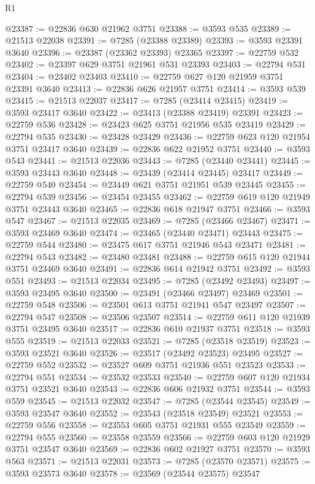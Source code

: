 \begin{lexlean}{R1}
\begin{coremodule}
@23387 := @22836 @630 @21962 @3751
@23388 := @3593 @535
@23389 := @21513 @22038
@23391 := @7285 (@23388 @23389)
@23393 := @3593 @23391 @3640
@23396 := @23387 (@23362 @23393) @23365
@23397 := @22759 @532
@23402 := @23397 @629 @3751 @21961 @531 @23393
@23403 := @22794 @531
@23404 := @23402 @23403
@23410 := @22759 @627 @120 @21959 @3751 @23391 @3640
@23413 := @22836 @626 @21957 @3751
@23414 := @3593 @539
@23415 := @21513 @22037
@23417 := @7285 (@23414 @23415)
@23419 := @3593 @23417 @3640
@23422 := @23413 (@23388 @23419) @23391
@23423 := @22759 @536
@23428 := @23423 @625 @3751 @21956 @535 @23419
@23429 := @22794 @535
@23430 := @23428 @23429
@23436 := @22759 @623 @120 @21954 @3751 @23417 @3640
@23439 := @22836 @622 @21952 @3751
@23440 := @3593 @543
@23441 := @21513 @22036
@23443 := @7285 (@23440 @23441)
@23445 := @3593 @23443 @3640
@23448 := @23439 (@23414 @23445) @23417
@23449 := @22759 @540
@23454 := @23449 @621 @3751 @21951 @539 @23445
@23455 := @22794 @539
@23456 := @23454 @23455
@23462 := @22759 @619 @120 @21949 @3751 @23443 @3640
@23465 := @22836 @618 @21947 @3751
@23466 := @3593 @547
@23467 := @21513 @22035
@23469 := @7285 (@23466 @23467)
@23471 := @3593 @23469 @3640
@23474 := @23465 (@23440 @23471) @23443
@23475 := @22759 @544
@23480 := @23475 @617 @3751 @21946 @543 @23471
@23481 := @22794 @543
@23482 := @23480 @23481
@23488 := @22759 @615 @120 @21944 @3751 @23469 @3640
@23491 := @22836 @614 @21942 @3751
@23492 := @3593 @551
@23493 := @21513 @22034
@23495 := @7285 (@23492 @23493)
@23497 := @3593 @23495 @3640
@23500 := @23491 (@23466 @23497) @23469
@23501 := @22759 @548
@23506 := @23501 @613 @3751 @21941 @547 @23497
@23507 := @22794 @547
@23508 := @23506 @23507
@23514 := @22759 @611 @120 @21939 @3751 @23495 @3640
@23517 := @22836 @610 @21937 @3751
@23518 := @3593 @555
@23519 := @21513 @22033
@23521 := @7285 (@23518 @23519)
@23523 := @3593 @23521 @3640
@23526 := @23517 (@23492 @23523) @23495
@23527 := @22759 @552
@23532 := @23527 @609 @3751 @21936 @551 @23523
@23533 := @22794 @551
@23534 := @23532 @23533
@23540 := @22759 @607 @120 @21934 @3751 @23521 @3640
@23543 := @22836 @606 @21932 @3751
@23544 := @3593 @559
@23545 := @21513 @22032
@23547 := @7285 (@23544 @23545)
@23549 := @3593 @23547 @3640
@23552 := @23543 (@23518 @23549) @23521
@23553 := @22759 @556
@23558 := @23553 @605 @3751 @21931 @555 @23549
@23559 := @22794 @555
@23560 := @23558 @23559
@23566 := @22759 @603 @120 @21929 @3751 @23547 @3640
@23569 := @22836 @602 @21927 @3751
@23570 := @3593 @563
@23571 := @21513 @22031
@23573 := @7285 (@23570 @23571)
@23575 := @3593 @23573 @3640
@23578 := @23569 (@23544 @23575) @23547

\end{coremodule}
\end{lexlean}
